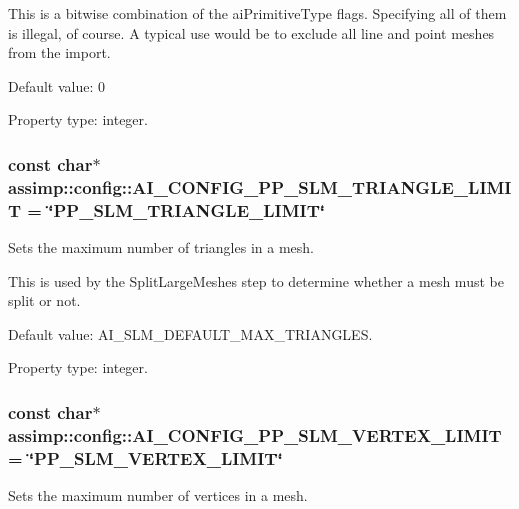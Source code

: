 This is a bitwise combination of the {\ttfamily ai\+Primitive\+Type} flags. Specifying all of them is illegal, of course. A typical use would be to exclude all line and point meshes from the import.

Default value\+: 0

Property type\+: integer. \hypertarget{namespaceassimp_1_1config_a63b46327cb4682e7e19471c787307482}{
\subsubsection[{A\+I\+\_\+\+C\+O\+N\+F\+I\+G\+\_\+\+P\+P\+\_\+\+S\+L\+M\+\_\+\+T\+R\+I\+A\+N\+G\+L\+E\+\_\+\+L\+I\+M\+I\+T}]{\setlength{\rightskip}{0pt plus 5cm}const char$\ast$ assimp\+::config\+::\+A\+I\+\_\+\+C\+O\+N\+F\+I\+G\+\_\+\+P\+P\+\_\+\+S\+L\+M\+\_\+\+T\+R\+I\+A\+N\+G\+L\+E\+\_\+\+L\+I\+M\+I\+T = \char`\"{}P\+P\+\_\+\+S\+L\+M\+\_\+\+T\+R\+I\+A\+N\+G\+L\+E\+\_\+\+L\+I\+M\+I\+T\char`\"{}}}\label{namespaceassimp_1_1config_a63b46327cb4682e7e19471c787307482}
Sets the maximum number of triangles in a mesh.

This is used by the {\ttfamily Split\+Large\+Meshes} step to determine whether a mesh must be split or not.

Default value\+: A\+I\+\_\+\+S\+L\+M\+\_\+\+D\+E\+F\+A\+U\+L\+T\+\_\+\+M\+A\+X\+\_\+\+T\+R\+I\+A\+N\+G\+L\+E\+S.

Property type\+: integer. \hypertarget{namespaceassimp_1_1config_a7efcd666dddd6efdd21dbacdc5a66fec}{
\subsubsection[{A\+I\+\_\+\+C\+O\+N\+F\+I\+G\+\_\+\+P\+P\+\_\+\+S\+L\+M\+\_\+\+V\+E\+R\+T\+E\+X\+\_\+\+L\+I\+M\+I\+T}]{\setlength{\rightskip}{0pt plus 5cm}const char$\ast$ assimp\+::config\+::\+A\+I\+\_\+\+C\+O\+N\+F\+I\+G\+\_\+\+P\+P\+\_\+\+S\+L\+M\+\_\+\+V\+E\+R\+T\+E\+X\+\_\+\+L\+I\+M\+I\+T = \char`\"{}P\+P\+\_\+\+S\+L\+M\+\_\+\+V\+E\+R\+T\+E\+X\+\_\+\+L\+I\+M\+I\+T\char`\"{}}}\label{namespaceassimp_1_1config_a7efcd666dddd6efdd21dbacdc5a66fec}
Sets the maximum number of vertices in a mesh.


